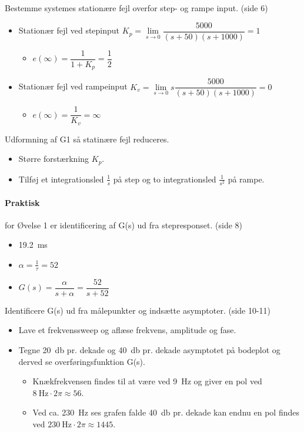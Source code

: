 \documentclass[danish]{article}
\begin{document}
Bestemme systemes stationære fejl overfor step- og rampe input. (side 6)
\begin{itemize}
	\item Stationær fejl ved stepinput $K_p = \lim\limits_{s\rightarrow 0} \dfrac{5000}{(s+50)(s+1000)}=1$
	\begin{itemize}
		\item $e(\infty)=\dfrac{1}{1+K_p} = \dfrac{1}{2}$
	\end{itemize}
	\item Stationær fejl ved rampeinput $K_v = \lim\limits_{s\rightarrow 0} s \dfrac{5000}{(s+50)(s+1000)}=0$
	\begin{itemize}
		\item $e(\infty)=\dfrac{1}{K_v} = \infty$
	\end{itemize}
\end{itemize}

Udformning af G1 så statinære fejl reduceres. 
\begin{itemize}
	\item Større forstærkning $K_p$.
	\item Tilføj et integrationsled $\frac{1}{s}$ på step og to integrationsled $\frac{1}{s^2}$ på rampe.
\end{itemize}

\paragraph{Praktisk} for Øvelse 1 er identificering af G(s) ud fra stepresponset. (side 8)

\begin{itemize}
	\item \si{\tau} \SI{19,2}{\milli\second}
	\item $\alpha = \frac{1}{\tau} = 52$
	\item $G(s)= \dfrac{\alpha}{s+\alpha} = \dfrac{52}{s+52}$
\end{itemize}

Identificere G(s) ud fra målepunkter og indsætte asymptoter. (side 10-11)
\begin{itemize}
	\item Lave et frekvenssweep og aflæse frekvens, amplitude og fase.
	\item Tegne \SI{20}{\decibel} pr. dekade og \SI{40}{\decibel} pr. dekade asymptotet på bodeplot og derved se overføringsfunktion G(s).
	\begin{itemize}
		\item Knækfrekvensen findes til at være ved \SI{9}{\hertz} og giver en pol ved $\SI{8}{\hertz}\cdot 2\pi \approx 56$.
		\item Ved ca. \SI{230}{\hertz} ses grafen falde \SI{40}{\decibel} pr. dekade kan endnu en pol findes ved $\SI{230}{\hertz}\cdot 2\pi \approx 1445$.
	\end{itemize}
\end{itemize}
\end{document}
